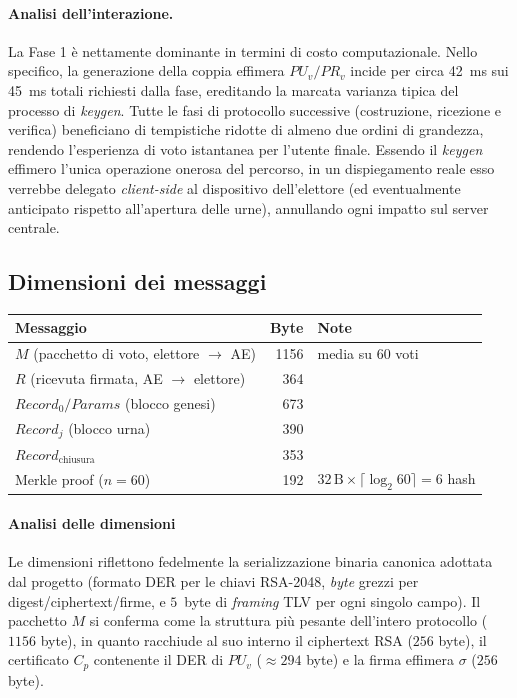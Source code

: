 \paragraph{Analisi dell'interazione.} La Fase 1 è nettamente dominante in termini di costo computazionale. Nello specifico, la generazione della coppia effimera $PU_v/PR_v$ incide per circa 42~ms sui 45~ms totali richiesti dalla fase, ereditando la marcata varianza tipica del processo di \emph{keygen}. Tutte le fasi di protocollo successive (costruzione, ricezione e verifica) beneficiano di tempistiche ridotte di almeno due ordini di grandezza, rendendo l'esperienza di voto istantanea per l'utente finale. Essendo il \emph{keygen} effimero l'unica operazione onerosa del percorso, in un dispiegamento reale esso verrebbe delegato \emph{client-side} al dispositivo dell'elettore (ed eventualmente anticipato rispetto all'apertura delle urne), annullando ogni impatto sul server centrale.

\subsection{Dimensioni dei messaggi}
\label{subsec:wp4_dimensioni}

\begin{center}
\small
\begin{tabular}{|l|r|l|}
\hline
\textbf{Messaggio} & \textbf{Byte} & \textbf{Note} \\
\hline
$M$ (pacchetto di voto, elettore $\to$ AE) & 1156 & media su 60 voti \\
$R$ (ricevuta firmata, AE $\to$ elettore)  & 364  & \\
$\mathit{Record}_0 / \mathit{Params}$ (blocco genesi) & 673 & \\
$\mathit{Record}_j$ (blocco urna)                      & 390 & \\
$\mathit{Record}_{\text{chiusura}}$                    & 353 & \\
Merkle proof ($n=60$) & 192 & $32\,\text{B} \times \lceil\log_2 60\rceil = 6$ hash \\
\hline
\end{tabular}
\end{center}

\paragraph{Analisi delle dimensioni} Le dimensioni riflettono fedelmente la serializzazione binaria canonica adottata dal progetto (formato DER per le chiavi RSA-2048, \emph{byte} grezzi per digest/ciphertext/firme, e $5$~byte di \emph{framing} TLV per ogni singolo campo). 
Il pacchetto $M$ si conferma come la struttura più pesante dell'intero protocollo ($1156$ byte), in quanto racchiude al suo interno il ciphertext RSA ($256$ byte), il certificato $C_p$ contenente il DER di $PU_v$ ($\approx 294$ byte) e la firma effimera $\sigma$ ($256$ byte).


